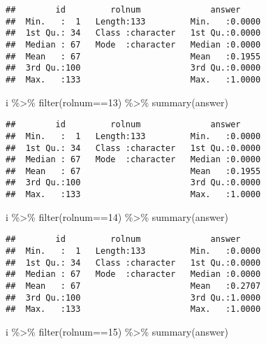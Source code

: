 \documentclass[
]{article}
\newenvironment{Shaded}{\begin{snugshade}}{\end{snugshade}}
\newcommand{\DecValTok}[1]{\textcolor[rgb]{0.00,0.00,0.81}{#1}}
\newcommand{\FunctionTok}[1]{\textcolor[rgb]{0.00,0.00,0.00}{#1}}
\newcommand{\NormalTok}[1]{#1}
\newcommand{\SpecialCharTok}[1]{\textcolor[rgb]{0.00,0.00,0.00}{#1}}
\begin{document}
\begin{enumerate}
\begin{verbatim}
##        id         rolnum              answer      
##  Min.   :  1   Length:133         Min.   :0.0000  
##  1st Qu.: 34   Class :character   1st Qu.:0.0000  
##  Median : 67   Mode  :character   Median :0.0000  
##  Mean   : 67                      Mean   :0.1955  
##  3rd Qu.:100                      3rd Qu.:0.0000  
##  Max.   :133                      Max.   :1.0000
\end{verbatim}

\begin{Shaded}
\begin{Highlighting}[]
\NormalTok{i }\SpecialCharTok{\%\textgreater{}\%} \FunctionTok{filter}\NormalTok{(rolnum}\SpecialCharTok{==}\DecValTok{13}\NormalTok{) }\SpecialCharTok{\%\textgreater{}\%} \FunctionTok{summary}\NormalTok{(answer)}
\end{Highlighting}
\end{Shaded}

\begin{verbatim}
##        id         rolnum              answer      
##  Min.   :  1   Length:133         Min.   :0.0000  
##  1st Qu.: 34   Class :character   1st Qu.:0.0000  
##  Median : 67   Mode  :character   Median :0.0000  
##  Mean   : 67                      Mean   :0.1955  
##  3rd Qu.:100                      3rd Qu.:0.0000  
##  Max.   :133                      Max.   :1.0000
\end{verbatim}

\begin{Shaded}
\begin{Highlighting}[]
\NormalTok{i }\SpecialCharTok{\%\textgreater{}\%} \FunctionTok{filter}\NormalTok{(rolnum}\SpecialCharTok{==}\DecValTok{14}\NormalTok{) }\SpecialCharTok{\%\textgreater{}\%} \FunctionTok{summary}\NormalTok{(answer)}
\end{Highlighting}
\end{Shaded}

\begin{verbatim}
##        id         rolnum              answer      
##  Min.   :  1   Length:133         Min.   :0.0000  
##  1st Qu.: 34   Class :character   1st Qu.:0.0000  
##  Median : 67   Mode  :character   Median :0.0000  
##  Mean   : 67                      Mean   :0.2707  
##  3rd Qu.:100                      3rd Qu.:1.0000  
##  Max.   :133                      Max.   :1.0000
\end{verbatim}

\begin{Shaded}
\begin{Highlighting}[]
\NormalTok{i }\SpecialCharTok{\%\textgreater{}\%} \FunctionTok{filter}\NormalTok{(rolnum}\SpecialCharTok{==}\DecValTok{15}\NormalTok{) }\SpecialCharTok{\%\textgreater{}\%} \FunctionTok{summary}\NormalTok{(answer)}
\end{Highlighting}
\end{Shaded}


\end{enumerate}
\end{document}
